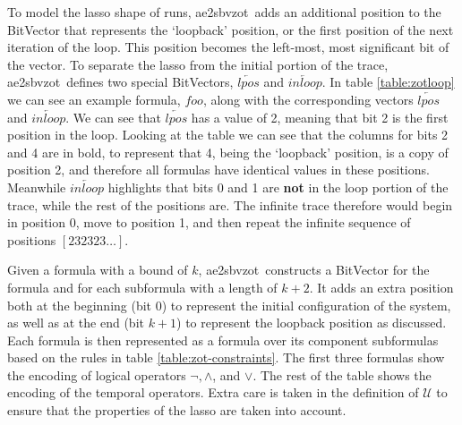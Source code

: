 \documentclass[a4paper,12pt]{article}
\newcommand{\aez}{ae2sbvzot}
\begin{document}
To model the lasso shape of runs, \aez\ adds an additional position to the
BitVector that represents the `loopback' position, or the first position of the
next iteration of the loop. This position becomes the left-most, most
significant bit of the vector. To separate the lasso from the initial portion of
the trace, \aez\ defines two special BitVectors, \(\overleftarrow{lpos}\) and
\(\overleftarrow{inloop}\). In table \ref{table:zotloop} we can see an example formula,
\(foo\), along with the corresponding vectors \(\overleftarrow{lpos}\) and
\(\overleftarrow{inloop}\). We can see that \(\overleftarrow{lpos}\) has a value
of 2, meaning that bit 2 is the first position in the loop. Looking at the table
we can see that the columns for bits 2 and 4 are in bold, to represent that 4,
being the `loopback' position, is a copy of position 2, and therefore all
formulas have identical values in these positions. Meanwhile
\(\overleftarrow{inloop}\) highlights that bits 0 and 1 are \textbf{not} in the
loop portion of the trace, while the rest of the positions are. The infinite
trace therefore would begin in position 0, move to position 1, and then repeat
the infinite sequence of positions \([232323\ldots]\).

Given a formula with a bound of \(k\), \aez\ constructs a BitVector for the
formula and for each subformula with a length of \(k{+}2\). It adds an extra
position both at the beginning (bit 0) to represent the initial configuration of
the system, as well as at the end (bit \(k{+}1\)) to represent the loopback
position as discussed. Each formula is then represented as a formula over its
component subformulas based on the rules in table \ref{table:zot-constraints}.
The first three formulas show the encoding of logical operators \(\neg, \land\),
and \(\lor\). The rest of the table shows the encoding of the temporal
operators. Extra care is taken in the definition of \(\mathcal{U}\) to ensure
that the properties of the lasso are taken into account.
\end{document}

